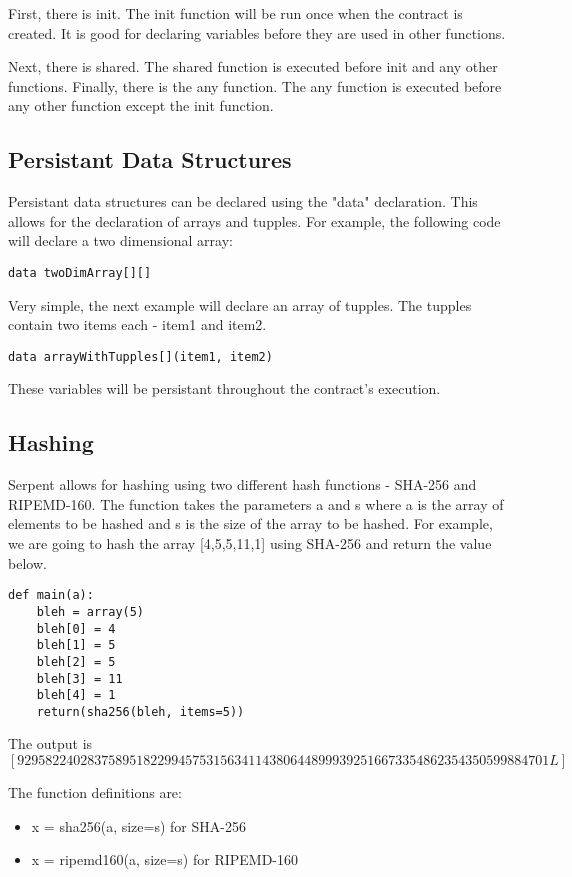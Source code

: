 \documentclass[12pt]{article}
\begin{document}
First, there is init. The init function will be run once when the contract is created. It is good for declaring variables before they are used in other functions.

Next, there is shared. The shared function is executed before init and any other functions. Finally, there is the any function. The any function is executed before any other function except the init function. 

\subsection{Persistant Data Structures}

Persistant data structures can be declared using the "data" declaration. This allows for the declaration of arrays and tupples. For example, the following code will declare a two dimensional array:

\begin{lstlisting}
data twoDimArray[][]
\end{lstlisting}

Very simple, the next example will declare an array of tupples. The tupples contain two items each - item1 and item2.

\begin{lstlisting}
data arrayWithTupples[](item1, item2)
\end{lstlisting}

These variables will be persistant throughout the contract's execution.

\subsection{Hashing}
Serpent allows for hashing using two different hash functions - SHA-256 and RIPEMD-160. The function takes the parameters a and s where a is the array of elements to be hashed and s is the size of the array to be hashed. For example, we are going to hash the array [4,5,5,11,1] using SHA-256 and return the value below.

\begin{lstlisting}
def main(a):
	bleh = array(5)
	bleh[0] = 4
	bleh[1] = 5
	bleh[2] = 5
	bleh[3] = 11
	bleh[4] = 1
	return(sha256(bleh, items=5))
\end{lstlisting}
The output is $[9295822402837589518229945753156341143806448999392516673354862354350599884701L]$

The function definitions are:
\begin{itemize}
	\item x = sha256(a, size=s) for SHA-256
	\item x = ripemd160(a, size=s) for RIPEMD-160
\end{itemize}
\end{document}

